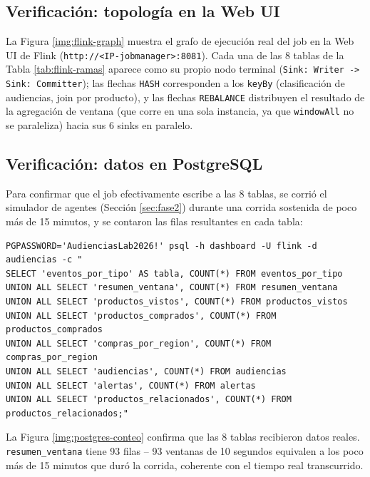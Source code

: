 \subsection{Verificación: topología en la Web UI}

La Figura \ref{img:flink-graph} muestra el grafo de ejecución real del job en la Web UI de Flink (\texttt{http://<IP-jobmanager>:8081}). Cada una de las 8 tablas de la Tabla \ref{tab:flink-ramas} aparece como su propio nodo terminal (\texttt{Sink: Writer -> Sink: Committer}); las flechas \texttt{HASH} corresponden a los \texttt{keyBy} (clasificación de audiencias, join por producto), y las flechas \texttt{REBALANCE} distribuyen el resultado de la agregación de ventana (que corre en una sola instancia, ya que \texttt{windowAll} no se paraleliza) hacia sus 6 sinks en paralelo.


\subsection{Verificación: datos en PostgreSQL}

Para confirmar que el job efectivamente escribe a las 8 tablas, se corrió el simulador de agentes (Sección \ref{sec:fase2}) durante una corrida sostenida de poco más de 15 minutos, y se contaron las filas resultantes en cada tabla:

\begin{lstlisting}[style=cmdbox]
PGPASSWORD='AudienciasLab2026!' psql -h dashboard -U flink -d audiencias -c "
SELECT 'eventos_por_tipo' AS tabla, COUNT(*) FROM eventos_por_tipo
UNION ALL SELECT 'resumen_ventana', COUNT(*) FROM resumen_ventana
UNION ALL SELECT 'productos_vistos', COUNT(*) FROM productos_vistos
UNION ALL SELECT 'productos_comprados', COUNT(*) FROM productos_comprados
UNION ALL SELECT 'compras_por_region', COUNT(*) FROM compras_por_region
UNION ALL SELECT 'audiencias', COUNT(*) FROM audiencias
UNION ALL SELECT 'alertas', COUNT(*) FROM alertas
UNION ALL SELECT 'productos_relacionados', COUNT(*) FROM productos_relacionados;"
\end{lstlisting}

La Figura \ref{img:postgres-conteo} confirma que las 8 tablas recibieron datos reales. \texttt{resumen\_ventana} tiene 93 filas -- 93 ventanas de 10 segundos equivalen a los poco más de 15 minutos que duró la corrida, coherente con el tiempo real transcurrido.

